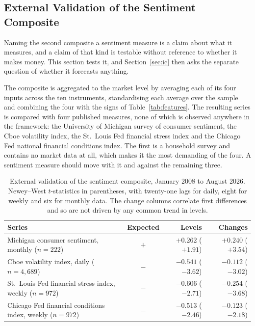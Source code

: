 \documentclass{singlecol-new}
\theoremstyle{TH}{
\newtheorem{lemma}{Lemma}
\newtheorem{theorem}[lemma]{Theorem}
\newtheorem{corrolary}[lemma]{Corrolary}
\newtheorem{conjecture}[lemma]{Conjecture}
\newtheorem{proposition}[lemma]{Proposition}
\newtheorem{claim}[lemma]{Claim}
\newtheorem{stheorem}[lemma]{Wrong Theorem}
\newtheorem{algorithm}{Algorithm}
}
\theoremstyle{THrm}{
\newtheorem{definition}{Definition}[section]
\newtheorem{question}{Question}[section]
\newtheorem{remark}{Remark}
\newtheorem{scheme}{Scheme}
}
\theoremstyle{THhit}{
\newtheorem{case}{Case}[section]
}
\begin{document}
\subsection{External Validation of the Sentiment Composite}
\label{sec:sentval}

Naming the second composite a sentiment measure is a claim about what it measures, and a
claim of that kind is testable without reference to whether it makes money. This section
tests it, and Section~\ref{sec:ic} then asks the separate question of whether it
forecasts anything.

The composite is aggregated to the market level by averaging each of its four inputs
across the ten instruments, standardising each average over the sample and combining the
four with the signs of Table~\ref{tab:features}. The resulting series is compared with
four published measures, none of which is observed anywhere in the framework: the
University of Michigan survey of consumer sentiment, the Cboe volatility index, the
St.~Louis Fed financial stress index and the Chicago Fed national financial conditions
index. The first is a household survey and contains no market data at all, which makes it
the most demanding of the four. A sentiment measure should move with it and against the
remaining three.

\begin{table}[!ht]
\centering
\caption{External validation of the sentiment composite, January 2008 to August 2026.
Newey--West $t$-statistics in parentheses, with twenty-one lags for daily, eight for
weekly and six for monthly data. The change columns correlate first differences and so
are not driven by any common trend in levels.}
\label{tab:sentval}
\small
\begin{tabular}{p{4.5cm}crr}
\hline
\textbf{Series} & \textbf{Expected} & \textbf{Levels} & \textbf{Changes} \\
\hline
Michigan consumer sentiment, monthly ($n=222$) & $+$ & $+0.262$ ($+1.91$) & $+0.240$ ($+3.54$) \\
\hline
Cboe volatility index, daily ($n=4{,}689$) & $-$ & $-0.541$ ($-3.62$) & $-0.112$ ($-3.02$) \\
\hline
St.~Louis Fed financial stress index, weekly ($n=972$) & $-$ & $-0.606$ ($-2.71$) & $-0.254$ ($-3.68$) \\
\hline
Chicago Fed financial conditions index, weekly ($n=972$) & $-$ & $-0.513$ ($-2.46$) & $-0.123$ ($-2.18$) \\
\hline
\end{tabular}
\end{table}
\end{document}
